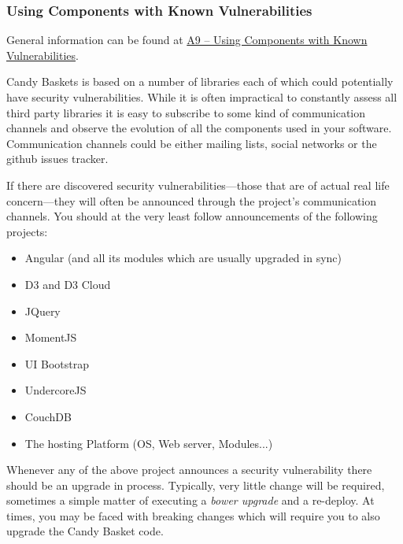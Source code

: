 \documentclass[letterpaper,10pt,english]{sphinxmanual}
\begin{document}
\subsubsection{Using Components with Known Vulnerabilities}
\label{developer-guide:using-components-with-known-vulnerabilities}
General information can be found at \href{https://owasp.org/index.php/Top\_10\_2013-A9-Using\_Components\_with\_Known\_Vulnerabilities}{A9 -- Using Components with Known
Vulnerabilities}.

Candy Baskets is based on a number of libraries each of which could
potentially have security vulnerabilities. While it is often
impractical to constantly assess all third party libraries it is easy
to subscribe to some kind of communication channels and observe the
evolution of all the components used in your software. Communication
channels could be either mailing lists, social networks or the github
issues tracker.

If there are discovered security vulnerabilities---those that are of
actual real life concern---they will often be announced through the
project's communication channels. You should at the very least follow
announcements of the following projects:
\begin{itemize}
\item {} 
Angular (and all its modules which are usually upgraded in sync)

\item {} 
D3 and D3 Cloud

\item {} 
JQuery

\item {} 
MomentJS

\item {} 
UI Bootstrap

\item {} 
UndercoreJS

\item {} 
CouchDB

\item {} 
The hosting Platform (OS, Web server, Modules...)

\end{itemize}

Whenever any of the above project announces a security vulnerability
there should be an upgrade in process. Typically, very little change
will be required, sometimes a simple matter of executing a \emph{bower
upgrade} and a re-deploy. At times, you may be faced with breaking
changes which will require you to also upgrade the Candy Basket code.
\end{document}
